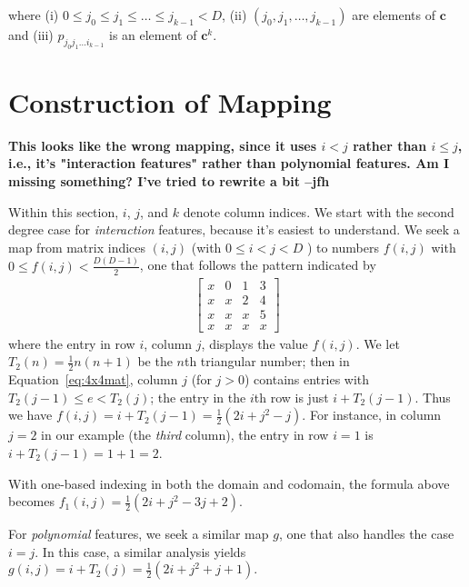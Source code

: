 \documentclass{article}
\begin{document}
where (i) $ 0 \le j_0 \le j_1 \le \dots \le j_{k-1} < D$, (ii) $(j_0, j_1, \dots, j_{k-1})$ are elements of $\bm{c}$ and (iii) $p_{j_0j_1 \dots i_{k-1}}$ is an element of $\bm{c}^k$. %

\section{Construction of Mapping}
\textbf{\color{red} This looks like the wrong mapping, since it uses $ i < j$ rather than $i \le j$, i.e., it's "interaction features" rather than polynomial features. Am I missing something? I've tried to rewrite a bit --jfh}

Within this section, $i$, $j$, and $k$ denote column indices.
We start with the second degree case for \emph{interaction} features, because it's easiest to understand. We seek a map from matrix indices $(i, j)$ (with $0 \le i < j < D$ ) to numbers $f(i, j)$ with $0 \le f(i, j) < \frac{D(D-1)}{2}$, one that follows the pattern indicated by 
\begin{align}
\begin{bmatrix}
x & 0 & 1 & 3 \\
x & x & 2 & 4 \\
x & x & x & 5 \\
x & x & x & x
\end{bmatrix}
\label{eq:4x4mat}
\end{align}
where the entry in row $i$, column $j$, displays the value $f(i, j)$. We let $T_2(n) = \frac{1}{2} n(n+1)$ 
be the $n$th triangular number; then in Equation~\ref{eq:4x4mat}, column $j$ (for $j > 0$) contains entries with  
$T_2(j-1) \le e < T_2(j)$; the entry in the $i$th row is just $i + T_2(j-1)$. Thus we have
$
f(i, j) 
= i + T_2(j-1) =  \frac{1}{2}(2i + j^2-j).$
For instance, in column $j = 2$ in our example (the \emph{third} column), the entry in row $i = 1$ is 
$i + T_2(j-1) = 1 + 1 = 2$. 

With one-based indexing in both the domain and codomain, the formula above becomes
$f_1(i, j)  = \frac{1}{2}(2i + j^2 - 3j + 2).$

For \emph{polynomial} features, we seek a similar map $g$, one that also handles the case $i = j$. In this case, a similar analysis yields
$ g(i, j) = i + T_2(j) = \frac{1}{2} (2i + j^2 + j + 1).$
\end{document}
